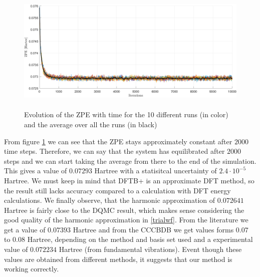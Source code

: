 \documentclass [12pt]{report}
\begin{document}
\begin{figure}[h!]
\includegraphics[width=\linewidth, height=6cm] {c2h6_1.png}
\caption{Evolution of the ZPE with time for the 10 different runs (in color) and the average over all the runs (in black)} \label{c2h6_1}
\end{figure}
From figure \ref{c2h6_1} we can see that the ZPE stays approximately constant after $2000$ time steps. Therefore, we can say that the system has equilibrated after $2000$ steps and we can start taking the average from there to the end of the simulation. This gives a value of $0.07293$ Hartree with a statisitcal uncertainty  of $2.4 \cdot 10^{-5}$ Hartree. We must keep in mind that DFTB+ is an approximate DFT method, so the result still lacks accuracy compared to a calculation with DFT energy calculations. We finally observe, that the harmonic approximation of $0.072641$ Hartree is fairly close to the DQMC result, which makes sense considering the good quality of the harmonic approximation in \ref{trialwf}. From the literature \cite{c2h6} we get a value of $0.07393$ Hartree and from the CCCBDB \cite{cccbdb} we get values forms $0.07$ to $0.08$ Hartree, depending on the method and basis set used and a experimental value of $0.072234$ Hartree (from fundamental vibrations). Event though these values are obtained from different methods, it suggests that our method is working correctly.
\end{document}
